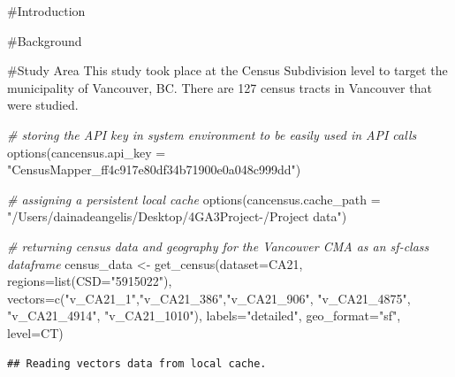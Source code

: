 \documentclass[
]{article}
\newenvironment{Shaded}{\begin{snugshade}}{\end{snugshade}}
\newcommand{\AttributeTok}[1]{\textcolor[rgb]{0.77,0.63,0.00}{#1}}
\newcommand{\CommentTok}[1]{\textcolor[rgb]{0.56,0.35,0.01}{\textit{#1}}}
\newcommand{\FunctionTok}[1]{\textcolor[rgb]{0.00,0.00,0.00}{#1}}
\newcommand{\NormalTok}[1]{#1}
\newcommand{\OtherTok}[1]{\textcolor[rgb]{0.56,0.35,0.01}{#1}}
\newcommand{\StringTok}[1]{\textcolor[rgb]{0.31,0.60,0.02}{#1}}
\begin{document}
\#Introduction

\#Background

\#Study Area This study took place at the Census Subdivision level to
target the municipality of Vancouver, BC. There are 127 census tracts in
Vancouver that were studied.

\begin{Shaded}
\begin{Highlighting}[]
\CommentTok{\# storing the API key in system environment to be easily used in API calls}
\FunctionTok{options}\NormalTok{(}\AttributeTok{cancensus.api\_key =} \StringTok{"CensusMapper\_ff4c917e80df34b71900e0a048c999dd"}\NormalTok{)}
\end{Highlighting}
\end{Shaded}

\begin{Shaded}
\begin{Highlighting}[]
\CommentTok{\# assigning a persistent local cache}
\FunctionTok{options}\NormalTok{(}\AttributeTok{cancensus.cache\_path =} \StringTok{"/Users/dainadeangelis/Desktop/4GA3Project{-}/Project data"}\NormalTok{)}
\end{Highlighting}
\end{Shaded}

\begin{Shaded}
\begin{Highlighting}[]
\CommentTok{\# returning census data and geography for the Vancouver CMA as an sf{-}class dataframe}
\NormalTok{census\_data }\OtherTok{\textless{}{-}} \FunctionTok{get\_census}\NormalTok{(}\AttributeTok{dataset=}\StringTok{\textquotesingle{}CA21\textquotesingle{}}\NormalTok{, }\AttributeTok{regions=}\FunctionTok{list}\NormalTok{(}\AttributeTok{CSD=}\StringTok{"5915022"}\NormalTok{), }\AttributeTok{vectors=}\FunctionTok{c}\NormalTok{(}\StringTok{"v\_CA21\_1"}\NormalTok{,}\StringTok{"v\_CA21\_386"}\NormalTok{,}\StringTok{"v\_CA21\_906"}\NormalTok{, }\StringTok{"v\_CA21\_4875"}\NormalTok{, }\StringTok{"v\_CA21\_4914"}\NormalTok{, }\StringTok{"v\_CA21\_1010"}\NormalTok{), }\AttributeTok{labels=}\StringTok{"detailed"}\NormalTok{, }\AttributeTok{geo\_format=}\StringTok{"sf"}\NormalTok{, }\AttributeTok{level=}\StringTok{\textquotesingle{}CT\textquotesingle{}}\NormalTok{)}
\end{Highlighting}
\end{Shaded}

\begin{verbatim}
## Reading vectors data from local cache.
\end{verbatim}
\end{document}
